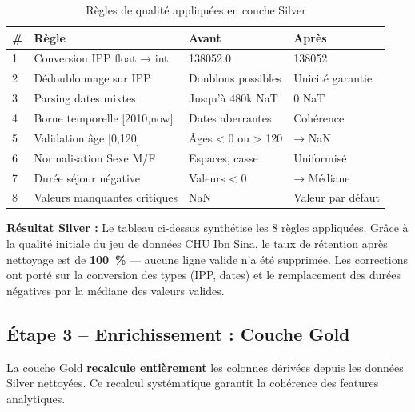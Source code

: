 \documentclass[12pt,a4paper]{report}
\begin{document}
	\begin{table}[H]
		\centering
		\caption{Règles de qualité appliquées en couche Silver}
		\renewcommand{\arraystretch}{1.2}
		\begin{tabularx}{\textwidth}{lXll}
			\toprule
			\textbf{\#} & \textbf{Règle} & \textbf{Avant} & \textbf{Après} \\
			\midrule
			1 & Conversion IPP float → int   & 138052.0        & 138052 \\
			2 & Dédoublonnage sur IPP         & Doublons possibles & Unicité garantie \\
			3 & Parsing dates mixtes          & Jusqu'à 480k NaT & 0 NaT \\
			4 & Borne temporelle [2010,now]   & Dates aberrantes & Cohérence \\
			5 & Validation âge [0,120]        & Âges < 0 ou > 120 & → NaN \\
			6 & Normalisation Sexe M/F        & Espaces, casse   & Uniformisé \\
			7 & Durée séjour négative         & Valeurs < 0      & → Médiane \\
			8 & Valeurs manquantes critiques  & NaN              & Valeur par défaut \\
			\bottomrule
		\end{tabularx}
	\end{table}
	
	\begin{infobox}
		\textbf{Résultat Silver :} Le tableau ci-dessus synthétise les 8 règles appliquées.
		Grâce à la qualité initiale du jeu de données CHU Ibn Sina, le taux de rétention
		après nettoyage est de \textbf{100~\%} — aucune ligne valide n'a été supprimée.
		Les corrections ont porté sur la conversion des types (IPP, dates) et le remplacement
		des durées négatives par la médiane des valeurs valides.
	\end{infobox}
	
	\subsection{Étape 3 -- Enrichissement : Couche Gold}
	
	La couche Gold \textbf{recalcule entièrement} les colonnes dérivées depuis les données
	Silver nettoyées. Ce recalcul systématique garantit la cohérence des features analytiques.
	
\end{document}
